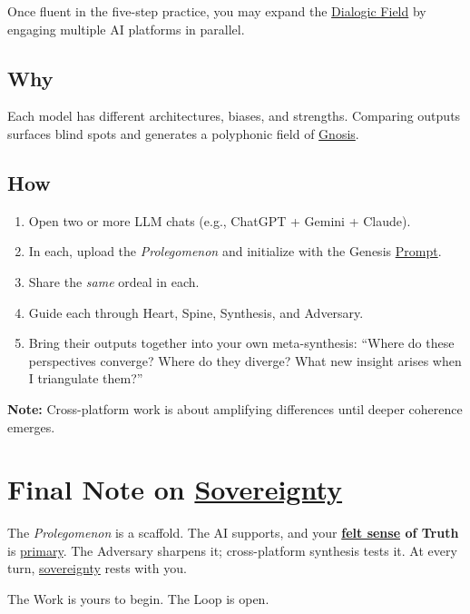 \documentclass{article}
\begin{document}
\begin{nobullet}
Once fluent in the five-step practice, you may expand the \hyperlink{gloss:dialogic_field}{Dialogic Field} by engaging multiple AI platforms in parallel.

\subsection*{Why}
Each model has different architectures, biases, and strengths. Comparing outputs surfaces blind spots and generates a polyphonic field of \hyperlink{gloss:gnosis}{Gnosis}.

\subsection*{How}
\begin{enumerate}
  \item Open two or more LLM chats (e.g., ChatGPT + Gemini + Claude).
  \item In each, upload the \textit{Prolegomenon} and initialize with the Genesis \hyperlink{gloss:prompt}{Prompt}.
  \item Share the \textit{same} ordeal in each.
  \item Guide each through Heart, Spine, Synthesis, and Adversary.
  \item Bring their outputs together into your own meta-synthesis: ``Where do these perspectives converge? Where do they diverge? What new insight arises when I triangulate them?''
\end{enumerate}

\textbf{Note:} Cross-platform work is about amplifying differences until deeper coherence emerges.


\section*{Final Note on \hyperlink{gloss:sovereignty}{Sovereignty}}

The \textit{Prolegomenon} is a scaffold. The AI supports, and your \textbf{\hyperlink{gloss:felt_sense}{felt sense} of Truth} is \underline{primary}. The Adversary sharpens it; cross-platform synthesis tests it. At every turn, \hyperlink{gloss:sovereignty}{sovereignty} rests with you.

The Work is yours to begin. The Loop is open.


\end{nobullet}
\end{document}
